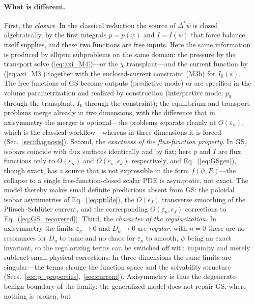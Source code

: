 \documentclass[english]{article}
\begin{document}
\paragraph{What is different.}
First, the \emph{closure}. In the classical reduction the source of $\Delta^*\psi$ is closed
algebraically, by the first integrals $p=p(\psi)$ and $I=I(\psi)$ that force balance itself
supplies, and these two functions are free inputs. Here the same information is produced by
elliptic subproblems on the same domain: the pressure by the transport solve
(\ref{eq:axi_M4})---or the $\chi$ transplant---and the current function by (\ref{eq:axi_M3})
together with the enclosed-current constraint (M3b) for $I_0(s)$. The free functions of GS become
outputs (predictive mode) or are specified in the volume parametrization and realized by
construction (interpretive mode: $p_0$ through the transplant, $I_0$ through the constraint); the
equilibrium and transport problems merge already in two dimensions, with the difference that in
axisymmetry the merger is optional---the problems separate cleanly at
$O(\varepsilon_\kappa)$, which is the classical workflow---whereas in three dimensions it is
forced (Sec.~\ref{sec:diagnosis}). Second, the \emph{exactness of the flux-function property}. In
GS, isobars coincide with flux surfaces identically and by fiat; here $p$ and $I$ are flux
functions only to $O(\varepsilon_\kappa)$ and $O(\varepsilon_\kappa,\epsilon_J)$ respectively, and
Eq.~(\ref{eq:GSgen}), though exact, has a source that is not expressible in the form
$f(\psi,R)$---the collapse to a single free-function-closed scalar PDE is asymptotic, not exact.
The model thereby makes small definite predictions absent from GS: the poloidal isobar asymmetries
of Eq.~(\ref{eq:ptilde}), the $O(\epsilon_J)$ transverse smoothing of the Pfirsch--Schl\"uter
current, and the corresponding $O(\varepsilon_\kappa,\epsilon_J)$ corrections to
Eq.~(\ref{eq:GS_recovered}). Third, the \emph{character of the regularization}. In axisymmetry the
limits $\varepsilon_\kappa\rightarrow0$ and $D_u\rightarrow0$ are \emph{regular}: with $n=0$ there
are no resonances for $D_u$ to tame and no chaos for $\varepsilon_\kappa$ to smooth, $\psi$ being
an exact invariant, so the regularizing terms can be switched off with impunity and merely
subtract small physical corrections. In three dimensions the same limits are singular---the terms
change the function space and the solvability structure
(Secs.~\ref{sec:p_properties},~\ref{sec:current}). Axisymmetry is thus the degenerate-benign
boundary of the family: the generalized model does not repair GS, where nothing is broken, but
\end{document}
